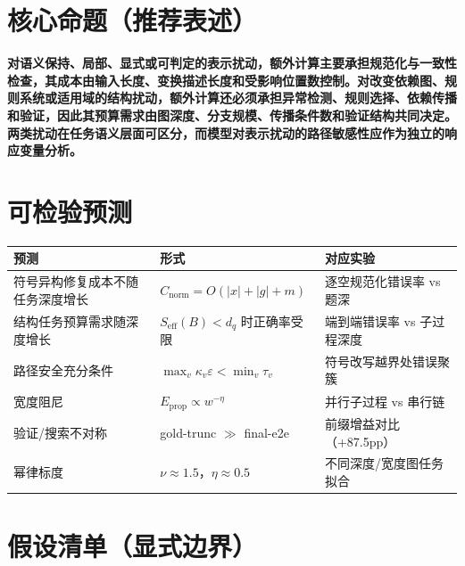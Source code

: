 \documentclass[11pt]{ctexart}
\begin{document}
\section{核心命题（推荐表述）}

\noindent\textbf{对语义保持、局部、显式或可判定的表示扰动，额外计算主要承担规范化与一致性检查，其成本由输入长度、变换描述长度和受影响位置数控制。对改变依赖图、规则系统或适用域的结构扰动，额外计算还必须承担异常检测、规则选择、依赖传播和验证，因此其预算需求由图深度、分支规模、传播条件数和验证结构共同决定。两类扰动在任务语义层面可区分，而模型对表示扰动的路径敏感性应作为独立的响应变量分析。}

\section{可检验预测}

\begin{center}
\begin{tabular}{p{4.4cm}p{4.6cm}p{5.0cm}}
\toprule
\textbf{预测} & \textbf{形式} & \textbf{对应实验} \\
\midrule
符号异构修复成本不随任务深度增长 & $C_{\mathrm{norm}}=O(|x|+|g|+m)$ & 逐空规范化错误率 vs 题深 \\
结构任务预算需求随深度增长 & $S_{\mathrm{eff}}(B)<d_q$ 时正确率受限 & 端到端错误率 vs 子过程深度 \\
路径安全充分条件 & $\max_v\kappa_v\varepsilon<\min_v\tau_v$ & 符号改写越界处错误聚簇 \\
宽度阻尼 & $E_{\mathrm{prop}}\propto w^{-\eta}$ & 并行子过程 vs 串行链 \\
验证/搜索不对称 & gold-trunc $\gg$ final-e2e & 前缀增益对比（+87.5pp） \\
幂律标度 & $\nu\approx1.5$，$\eta\approx0.5$ & 不同深度/宽度图任务拟合 \\
\bottomrule
\end{tabular}
\end{center}

\section{假设清单（显式边界）}
\end{document}

